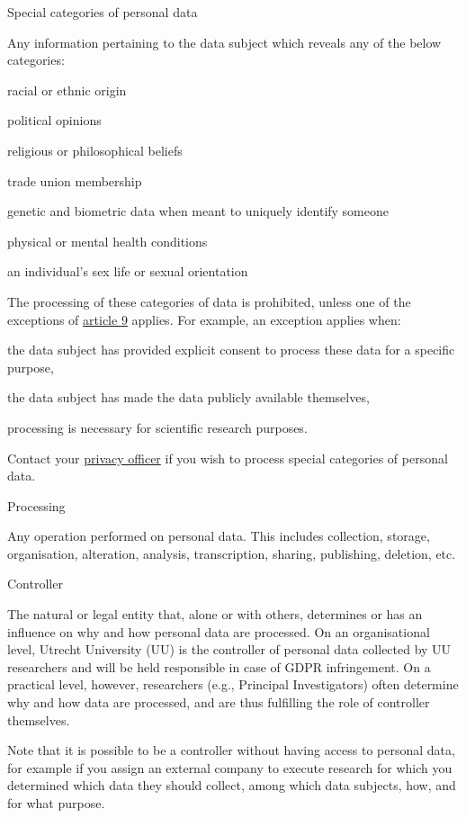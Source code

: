 \documentclass[
]{book}
\begin{document}
Special categories of personal data

Any information pertaining to the data subject which reveals any of the below categories:

racial or ethnic origin

political opinions

religious or philosophical beliefs

trade union membership

genetic and biometric data when meant to uniquely identify someone

physical or mental health conditions

an individual's sex life or sexual orientation

The processing of these categories of data is prohibited, unless one of
the exceptions of \href{https://gdpr-info.eu/art-9-gdpr/}{article 9}
applies. For example, an exception applies when:

the data subject has provided explicit consent to process these data for
a specific purpose,

the data subject has made the data publicly available themselves,

processing is necessary for scientific research purposes.

Contact your \protect\hyperlink{support}{privacy officer} if you wish to process special categories of personal data.

Processing

Any operation performed on personal data. This includes collection, storage,
organisation, alteration, analysis, transcription, sharing, publishing, deletion, etc.

Controller

The natural or legal entity that, alone or with others, determines or has an
influence on why and how personal data are processed. On an
organisational level, Utrecht University (UU) is the controller of personal
data collected by UU researchers and will be held responsible in case of GDPR
infringement. On a practical level, however, researchers (e.g., Principal
Investigators) often determine why and how data are processed, and are thus
fulfilling the role of controller themselves.

Note that it is possible to be a controller without having access to personal
data, for example if you assign an external company to execute research for
which you determined which data they should collect, among which data subjects,
how, and for what purpose.
\end{document}
